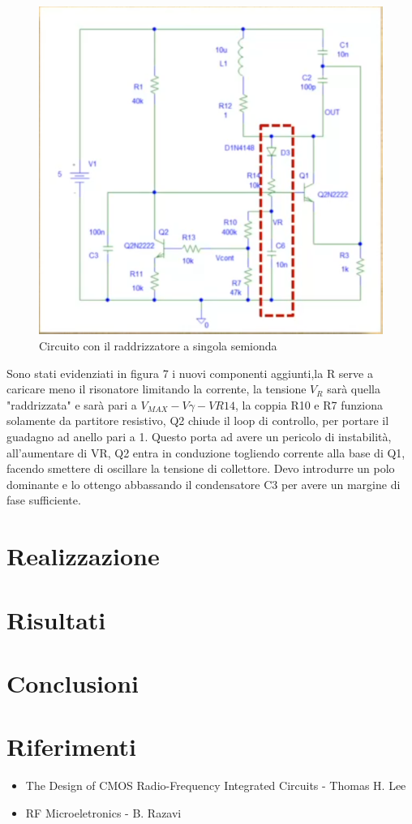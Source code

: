 \documentclass{article}
\begin{document}
~\begin{figure}[H]
\includegraphics[scale=0.9]{RSS.png}
\centering
\caption{Circuito con il raddrizzatore a singola semionda}
\label{fig:foo}
\end{figure}
Sono stati evidenziati in figura 7 i nuovi componenti aggiunti,la R serve a caricare meno il risonatore limitando la corrente, la tensione $V_R$ sarà quella "raddrizzata" e sarà pari a $V_{MAX}-V\gamma-VR14$, la coppia R10 e R7 funziona solamente da partitore resistivo, Q2 chiude il loop di controllo, per portare il guadagno ad anello pari a 1.
Questo porta ad avere un pericolo di instabilità, all'aumentare di VR, Q2 entra in conduzione togliendo corrente alla base di Q1, facendo smettere di oscillare la tensione di collettore.
Devo introdurre un polo dominante e lo ottengo abbassando il condensatore C3 per avere un margine di fase sufficiente.
\newpage
\section{Realizzazione}

\newpage
\section{Risultati}

\newpage

\section{Conclusioni}

\newpage
\section{Riferimenti}

\begin{itemize}
\item The Design of CMOS Radio-Frequency Integrated Circuits - Thomas H. Lee
\item RF Microeletronics - B. Razavi
\end{itemize}
\end{document}
